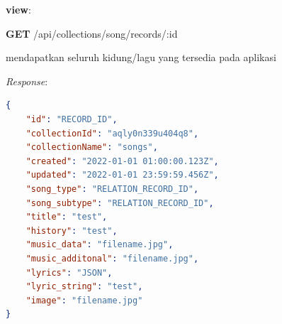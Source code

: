 \documentclass[a4paper, 12pt]{article}
\begin{document}
\textbf{view}:

\textbf{GET} /api/collections/song/records/:id

\indent mendapatkan seluruh kidung/lagu yang tersedia pada aplikasi

\textit{Response}:
\begin{lstlisting}[language=json,firstnumber=1]
{
    "id": "RECORD_ID",
    "collectionId": "aqly0n339u404q8",
    "collectionName": "songs",
    "created": "2022-01-01 01:00:00.123Z",
    "updated": "2022-01-01 23:59:59.456Z",
    "song_type": "RELATION_RECORD_ID",
    "song_subtype": "RELATION_RECORD_ID",
    "title": "test",
    "history": "test",
    "music_data": "filename.jpg",
    "music_additonal": "filename.jpg",
    "lyrics": "JSON",
    "lyric_string": "test",
    "image": "filename.jpg"
}
\end{lstlisting}
\end{document}
